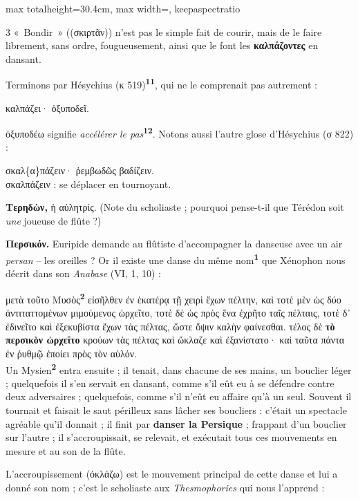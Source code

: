 \documentclass[11pt,twoside]{book}
\newcommand{\italique}[1]{\textit{#1}}
\newcommand{\citComm}[1]{\begin{quoting}[vskip=0.4pt,leftmargin=0.7em,rightmargin=0.2em]#1\end{quoting}}
\newcommand{\marqueur}[1]{\textsuperscript{\color{rubricRed}\textbf{#1}}}
\begin{document}
\begin{adjustbox}{max totalheight=30.4cm, max width=\textwidth, keepaspectratio}
\begin{minipage}{\textwidth}
{\begin{multicols}{3}
{«~Bondir~» ((σκιρτᾶν)) n'est pas le simple fait de courir, mais de le faire librement, sans ordre, fougueusement, ainsi que le font les \textbf{καλπάζοντες} en dansant.}
\par\vspace{1.5pt}
\noindent Terminons par Hésychius (κ 519)\marqueur{11}, qui ne le comprenait pas autrement :
\citComm{καλπάζει· ὀξυποδεῖ.}
\par\vspace{1.5pt}
\noindent ὀξυποδέω signifie \italique{accélérer le pas}\marqueur{12}. Notons aussi l'autre glose d'Hésychius (σ 822) :
\citComm{σκαλ\{α\}πάζειν· ῥεμβωδῶς βαδίζειν.\\
σκαλπάζειν : se déplacer en tournoyant.}
\par\vspace{1.5pt}
 \textbf{Τερηδὼν,} ἡ αὐλητρίς. (Note du scholiaste ; pourquoi pense-t-il que Térédon soit \italique{une} joueuse de flûte ?)
\par\vspace{1.5pt}
 \textbf{Περσικόν.} Euripide demande au flûtiste d'accompagner la danseuse avec un air \italique{persan} -- les oreilles ? Or il existe une danse du même nom\marqueur{1} que Xénophon nous décrit dans son \italique{Anabase} (VI, 1, 10) :
\citComm{μετὰ τοῦτο Μυσὸς\marqueur{2} εἰσῆλθεν ἐν ἑκατέρᾳ τῇ χειρὶ ἔχων πέλτην, καὶ τοτὲ μὲν ὡς δύο ἀντιταττομένων μιμούμενος ὠρχεῖτο, τοτὲ δὲ ὡς πρὸς ἕνα ἐχρῆτο ταῖς πέλταις, τοτὲ δ᾽ ἐδινεῖτο καὶ ἐξεκυβίστα ἔχων τὰς πέλτας, ὥστε ὄψιν καλὴν φαίνεσθαι. τέλος δὲ \textbf{τὸ περσικὸν ὠρχεῖτο} κρούων τὰς πέλτας καὶ ὤκλαζε καὶ ἐξανίστατο· καὶ ταῦτα πάντα ἐν ῥυθμῷ ἐποίει πρὸς τὸν αὐλόν.\\
Un Mysien\marqueur{2} entra ensuite ; il tenait, dans chacune de ses mains, un bouclier léger ; quelquefois il s'en servait en dansant, comme s'il eût eu à se défendre contre deux adversaires ; quelquefois, comme s'il n'eût eu affaire qu'à un seul. Souvent il tournait et faisait le saut périlleux sans lâcher ses boucliers : c'était un spectacle agréable qu'il donnait ; il finit par \textbf{danser la Persique} ; frappant d'un bouclier sur l'autre ; il s'accroupissait, se relevait, et exécutait tous ces mouvements en mesure et au son de la flûte.}
\par\vspace{1.5pt}
\noindent L'accroupissement (ὀκλάζω) est le mouvement principal de cette danse et lui a donné son nom ; c'est le scholiaste aux \italique{Thesmophories} qui nous l'apprend :

\end{multicols}}
\end{minipage}
\end{adjustbox}
\end{document}
